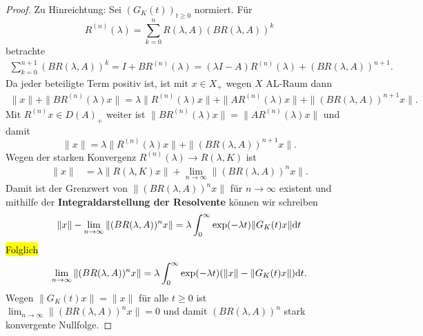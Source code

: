 \begin{proof}

\par 
Zu Hinreichtung: Sei $(G_K(t))_{t\geq0}$ normiert. Für 
\begin{equation}
R^{(n)}(\lambda) = \sum_{k=0}^n R(\lambda, A)(BR(\lambda, A))^k
\end{equation}
betrachte 
\begin{align*}
 \sum_{k=0}^{n+1} (BR(\lambda, A))^k=I +BR^{(n)}(\lambda)=(\lambda I -A)R^{(n)}(\lambda) + (BR(\lambda, A))^{n+1}.
\end{align*} 
Da jeder beteiligte Term positiv ist, ist mit $x\in X_+$ wegen $X$ AL-Raum dann
\begin{align*}
\|x\| + \|BR^{(n)}(\lambda)x\|= \lambda\| R^{(n)}(\lambda) x\| + \|AR^{(n)} (\lambda) x\|+\|(BR(\lambda, A))^{n+1}x\|.
\end{align*}
Mit $R^{(n)}x\in D(A)_+$ weiter ist $\|BR^{(n)}(\lambda)x\|=\|AR^{(n)}(\lambda) x\|$ und damit
\begin{equation*}
\|x\|=\lambda \|R^{(n)}(\lambda)x\| + \|(BR(\lambda, A))^{n+1}x\|.
\end{equation*}
Wegen der starken Konvergenz $R^{(n)}(\lambda)\to R(\lambda, K)$ ist
\begin{align*}
\|x\|
&=\lambda\|R(\lambda, K)x\|+\lim_{n\to\infty}\|(BR(\lambda, A))^n x\|.
\end{align*}
Damit ist der Grenzwert von $\|(BR(\lambda, A))^n x\|$ für $n\to\infty$ existent und mithilfe der  \index{}\textbf{Integraldarstellung der Resolvente} können wir schreiben 
\begin{align*}
\|x\| - \lim_{n\to\infty}\|(BR(\lambda, A))^n x\| = \lambda\int_0^\infty \exp(-\lambda t)\|G_K(t)x\|\textnormal dt
\end{align*}
\hl{Folglich}
\begin{equation*}
\lim_{n\to\infty}\|(BR(\lambda, A))^n x\| =\lambda \int_0^\infty \exp(-\lambda t)(\|x\|-\|G_K(t)x\|)\textnormal dt.
\end{equation*}
Wegen $\|G_K(t)x\| = \|x\|$ für alle $t\geq0$ ist $\lim_{n\to\infty}\|(BR(\lambda, A))^n x\|=0$ und damit  $(BR(\lambda, A))^n$ stark konvergente Nullfolge.


\end{proof}
